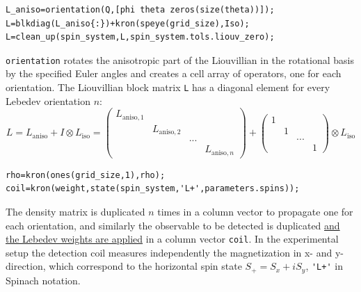 \documentclass[11.5pt,a4paper]{article}
\begin{document}
\begin{lstlisting}[firstnumber=last]
% Get the orientation array
L_aniso=orientation(Q,[phi theta zeros(size(theta))]);
L=blkdiag(L_aniso{:})+kron(speye(grid_size),Iso);
L=clean_up(spin_system,L,spin_system.tols.liouv_zero);
\end{lstlisting}
\verb$orientation$ rotates the anisotropic part of the Liouvillian in the rotational basis by the specified Euler angles and creates a cell array of operators, one for each orientation. The Liouvillian block matrix \verb$L$ has a diagonal element for every Lebedev orientation $n$:
\begin{equation}
 L= L_{\text{aniso}} + I \otimes L_\text{iso} =
	      \begin{pmatrix} 
		L_{\text{aniso},1} & & & \\
		& L_{\text{aniso},2} & & \\
		& & \text{...} & \\
		& & & L_{\text{aniso},n}
              \end{pmatrix} +
	      \begin{pmatrix} 
		1 & & & \\
		& 1 & & \\
		& & \text{...} & \\
		& & & 1
              \end{pmatrix} \otimes L_\text{iso}
\end{equation}

\begin{lstlisting}[firstnumber=last]
% Get the initial and the detection states
rho=kron(ones(grid_size,1),rho);
coil=kron(weight,state(spin_system,'L+',parameters.spins));
\end{lstlisting}
The density matrix is duplicated $n$ times in a column vector to propagate one for each orientation, and similarly the observable to be detected is duplicated \underline{and the Lebedev weights are applied} in a column vector \verb$coil$. In the experimental setup the detection coil measures independently the magnetization in x- and y-direction, which correspond to the horizontal spin state $S_+ = S_x + i S_y$, \verb$'L+'$ in Spinach notation.
\end{document}
